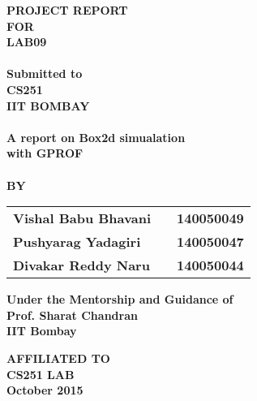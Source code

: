 \newpage
\begin{center}
\thispagestyle{empty}
\Large{\textbf{PROJECT REPORT\\ \large{FOR}}}\\[0.7cm]
\LARGE{\textsc {\textbf{LAB09}}}\\[0.5cm]
\vspace{0.5cm}
\Large{\textbf{\\Submitted to}}
\LARGE{\textbf{\\CS251\\IIT BOMBAY\\}}
\vspace{1cm}
\Large{\textbf{\\A report on Box2d simualation\\with GPROF\\}}
\vspace{1cm}
\Large{\textbf{\\BY}}\\[0.5cm]
\begin{table}[h]
\centering
\Large{
\begin{tabular}{>{\bfseries}lc>{\bfseries}r}
Vishal Babu Bhavani & & 140050049\\Pushyarag Yadagiri & & 140050047\\Divakar Reddy Naru & & 140050044\\
\end{tabular}}
\end{table}
\vspace{0.5cm}
\large{\textbf{Under the Mentorship and Guidance of}}\\
\large{\textbf{Prof. Sharat Chandran\\ IIT Bombay}}\\
\vspace{1cm}

\Large{\textbf{AFFILIATED TO\\}}
\LARGE{\textbf{CS251 LAB}}\\
\vspace{1cm}
\large{\textbf{October 2015}}\\
\vspace{1cm}
\newpage
\end{center}